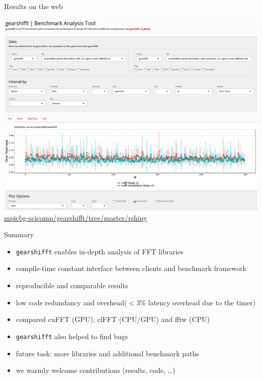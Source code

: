 \documentclass[t,11pt,hyperref={
  pdftitle = {gearshifft},
  pdfsubject = {gearshifft},
  pdfborder={0 0 0},
  colorlinks=true,
  urlcolor=red,
  citecolor=red,
  linkcolor=red,
  pdfauthor={Peter Steinbach, Matthias Werner}
  }
]{beamer}
\def\resetbeamertemplate{\setbeamertemplate{background canvas}{ }}
\newcommand{\gearshifft}{\texttt{gearshifft}}
\begin{document}
\begin{frame}{Results on the web}
  \begin{center}
    \includegraphics[width=.8\textwidth]{rshiny.png}\\[20pt]
    \href{https://github.com/mpicbg-scicomp/gearshifft/tree/master/rshiny}{mpicbg-scicomp/gearshifft/tree/master/rshiny}
  \end{center}

\end{frame}


\begin{frame}{Summary}{}
  
  \begin{itemize}
  \item \gearshifft{} enables in-depth analysis of FFT libraries
    \item compile-time constant interface between clients and benchmark framework
    \item reproducible and comparable results
    \item low code redundancy and overhead\newline ($<3\%$ latency overhead due to the timer)
  \item compared cuFFT (GPU), clFFT (CPU/GPU) and fftw (CPU)
  \item \gearshifft{} also helped to find bugs
  \item future task: more libraries and additional benchmark paths       
  \item we warmly welcome contributions (results, code, \ldots)
    
  \end{itemize}
\end{frame}
\end{document}
